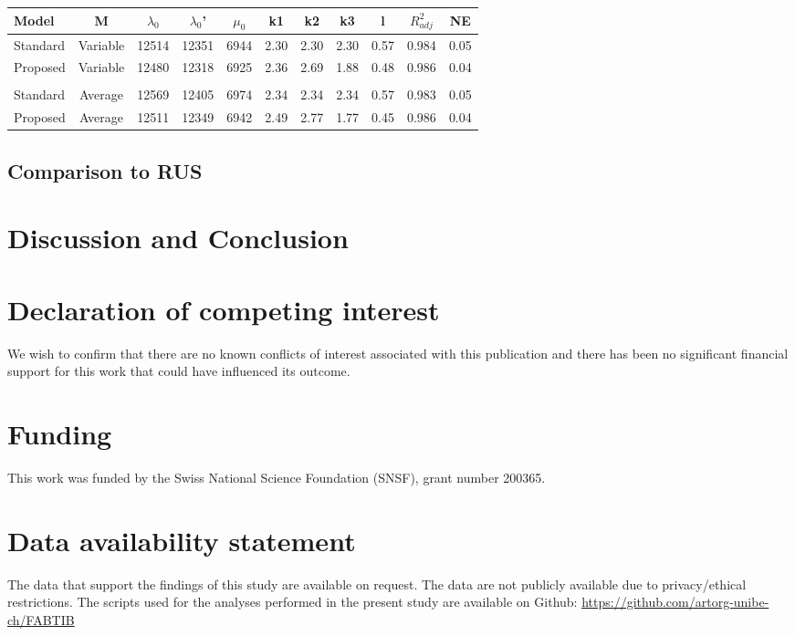 \documentclass[a4paper,fleqn]{DC_ArtStyle}
\begin{document}
	\begin{table}[!hb]
		\begin{tabular}{l|c|c|c|c|c|c|c|c|c|c}
			Model & M & $\lambda_0$ & $\lambda_0$' & $\mu_0$ & k1 & k2 & k3 & l & $R^2_{adj}$ & NE \\
			\hline
			Standard & Variable & 12514 & 12351 & 6944 & 2.30 & 2.30 & 2.30 & 0.57 & 0.984 & 0.05 \\
			Proposed & Variable & 12480 & 12318 & 6925 & 2.36 & 2.69 & 1.88 & 0.48 & 0.986 & 0.04\\
			&&&&&&&&&&\\[-0.5em]
			Standard & Average & 12569 & 12405 & 6974 & 2.34 & 2.34 & 2.34 & 0.57 & 0.983 & 0.05 \\
			Proposed & Average & 12511 & 12349 & 6942 & 2.49 & 2.77 & 1.77 & 0.45 & 0.986 & 0.04 \\
			\hline
		\end{tabular}
	\end{table}

	\clearpage
	\subsection{Comparison to RUS}

	
	\clearpage
	\section{Discussion and Conclusion}
	
	
	\section*{Declaration of competing interest}
	We wish to confirm that there are no known conflicts of interest associated with this publication and there has been no significant financial support for this work that could have influenced its outcome.
	
	\section*{Funding}
	This work was funded by the Swiss National Science Foundation (SNSF), grant number 200365.

	\section*{Data availability statement}
	The data that support the findings of this study are available on request. The data are not publicly available due to privacy/ethical restrictions. The scripts used for the analyses performed in the present study are available on Github: \url{https://github.com/artorg-unibe-ch/FABTIB}
	
\end{document}
